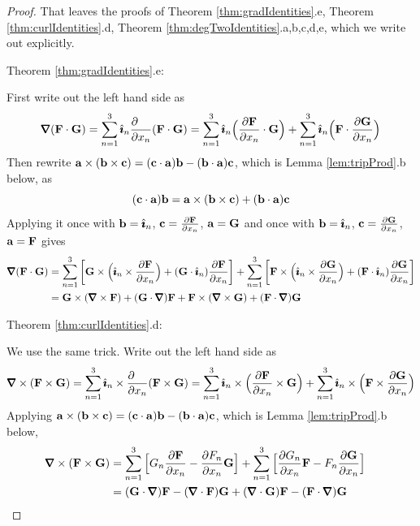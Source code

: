 \begin{proof}
\bigskip
\noindent That leaves the proofs of 
       Theorem \ref{thm:gradIdentities}.e,
       Theorem \ref{thm:curlIdentities}.d,
       Theorem \ref{thm:degTwoIdentities}.a,b,c,d,e, 
which we write out explicitly.

\bigskip
\noindent Theorem \ref{thm:gradIdentities}.e:

First write out the left hand side as
\begin{align*}
\vnabla(\vF\cdot\vG)
=\sum_{n=1}^3\hi_n\frac{\partial\hfill}{\partial x_n}(\vF\cdot\vG)
=\sum_{n=1}^3\hi_n\Big(\frac{\partial\vF}{\partial x_n}\cdot\vG\Big)
+\sum_{n=1}^3\hi_n\Big(\vF\cdot\frac{\partial\vG}{\partial x_n}\Big)
\end{align*}
Then rewrite $\mathbf{a}\times(\mathbf{b}\times\mathbf{c})=(\mathbf{c}\cdot\mathbf{a})\mathbf{b}-(\mathbf{b}\cdot\mathbf{a})\mathbf{c}$,
which is Lemma \ref{lem:tripProd}.b below, as 
\begin{equation*}
(\mathbf{c}\cdot\mathbf{a})\mathbf{b}=\mathbf{a}\times(\mathbf{b}\times\mathbf{c})+(\mathbf{b}\cdot\mathbf{a})\mathbf{c}
\end{equation*}
Applying it once with 
$\mathbf{b}=\hat{\pmb{\imath}}_n$, $\mathbf{c}=\frac{\partial\mathbf{F}}{\partial x_n}$, $\mathbf{a}=\mathbf{G}$ and once with
$\mathbf{b}=\hat{\pmb{\imath}}_n$, $\mathbf{c}=\frac{\partial\mathbf{G}}{\partial x_n}$, $\mathbf{a}=\mathbf{F}$ gives
\begin{align*}
\vnabla(\vF\cdot\vG)
&=\sum_{n=1}^3\bigg[
     \vG\times\Big(\hi_n\times\frac{\partial\vF}{\partial x_n}\Big)
     +(\vG\cdot\hi_n)\frac{\partial\vF}{\partial x_n}\bigg]
+\sum_{n=1}^3\bigg[
     \vF\times\Big(\hi_n\times\frac{\partial\vG}{\partial x_n}\Big)
     +(\vF\cdot\hi_n)\frac{\partial\vG}{\partial x_n}\bigg] \\
&=\vG\times(\vnabla\times\vF) +(\vG\cdot\vnabla)\vF
  +\vF\times(\vnabla\times\vG) +(\vF\cdot\vnabla)\vG
\end{align*}



\bigskip
\noindent Theorem \ref{thm:curlIdentities}.d:

We use the same trick. Write out the left hand side as
\begin{align*}
\vnabla\times(\vF\times\vG)
=\sum_{n=1}^3\hi_n\times\frac{\partial\hfill}{\partial x_n}(\vF\times\vG)
=\sum_{n=1}^3\hi_n\times\Big(\frac{\partial\vF}{\partial x_n}\times\vG\Big)
+\sum_{n=1}^3\hi_n\times\Big(\vF\times\frac{\partial\vG}{\partial x_n}\Big)
\end{align*}
Applying $\mathbf{a}\times(\mathbf{b}\times\mathbf{c})=(\mathbf{c}\cdot\mathbf{a})\mathbf{b}-(\mathbf{b}\cdot\mathbf{a})\mathbf{c}$,
which is Lemma \ref{lem:tripProd}.b below,
\begin{align*}
\vnabla\times(\vF\times\vG)&=
\sum_{n=1}^3\Big[G_n\frac{\partial \vF}{\partial x_n}
-\frac{\partial F_n}{\partial x_n}\vG\Big]
+\sum_{n=1}^3\Big[\frac{\partial G_n}{\partial x_n}\vF
-F_n\frac{\partial \vG}{\partial x_n}\Big]\cr
&=(\vG\cdot\vnabla)\vF -(\vnabla\cdot\vF)\vG+(\vnabla\cdot\vG)\vF
-(\vF\cdot\vnabla)\vG
\end{align*}


\end{proof}
